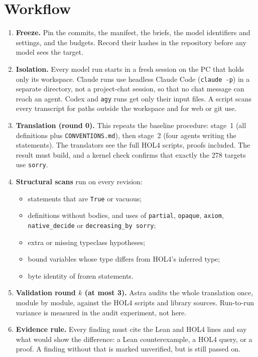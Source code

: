 \documentclass[11pt,a4paper]{article}
\newcommand{\code}[1]{\texttt{#1}}
\begin{document}
\section{Workflow}
\begin{enumerate}
\item \textbf{Freeze.} Pin the commits, the manifest, the briefs, the model identifiers and settings, and the budgets. Record their hashes in the repository before any model sees the target.

\item \textbf{Isolation.} Every model run starts in a fresh session on the PC that holds only its workspace. Claude runs use headless Claude Code (\code{claude -p}) in a separate directory, not a project-chat session, so that no chat message can reach an agent. Codex and \code{agy} runs get only their input files. A script scans every transcript for paths outside the workspace and for web or git use.

\item \textbf{Translation (round 0).} This repeats the baseline procedure: stage~1 (all definitions plus \code{CONVENTIONS.md}), then stage~2 (four agents writing the statements). The translators see the full HOL4 scripts, proofs included. The result must build, and a kernel check confirms that exactly the 278 targets use \code{sorry}.

\item \textbf{Structural scans} run on every revision:
\begin{itemize}
\item statements that are \code{True} or vacuous;
\item definitions without bodies, and uses of \code{partial}, \code{opaque}, \code{axiom}, \code{native\_decide} or \code{decreasing\_by sorry};
\item extra or missing typeclass hypotheses;
\item bound variables whose type differs from HOL4's inferred type;
\item byte identity of frozen statements.
\end{itemize}

\item \textbf{Validation round $k$ (at most 3).} Astra audits the whole translation once, module by module, against the HOL4 scripts and library sources. Run-to-run variance is measured in the audit experiment, not here.

\item \textbf{Evidence rule.} Every finding must cite the Lean and HOL4 lines and say what would show the difference: a Lean counterexample, a HOL4 query, or a proof. A finding without that is marked unverified, but is still passed on.


\end{enumerate}
\end{document}
